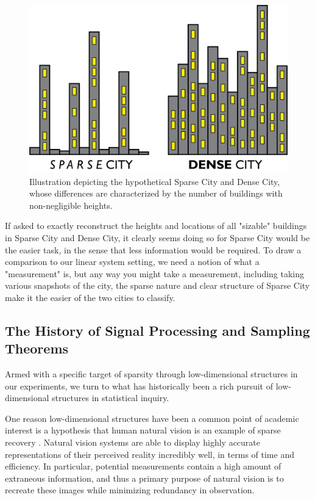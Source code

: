 \documentclass[12pt,a4paper]{amsart}
\numberwithin{equation}{section}
\theoremstyle{plain}
\theoremstyle{definition}
\begin{document}
\begin{figure}
\includegraphics[scale = 0.7]{sparse_dense_city_final.png}
\caption{Illustration depicting the hypothetical Sparse City and Dense City, whose differences are characterized by the number of buildings with non-negligible heights.}
\label{ill}
\end{figure}

If asked to exactly reconstruct the heights and locations of all "sizable" buildings in Sparse City and Dense City, it clearly seems doing so for Sparse City would be the easier task, in the sense that less information would be required. To draw a comparison to our linear system setting, we need a notion of what a "measurement" is, but any way you might take a measurement, including taking various snapshots of the city, the sparse nature and clear structure of Sparse City make it the easier of the two cities to classify.


\subsection*{The History of Signal Processing and Sampling Theorems}

Armed with a specific target of sparsity through low-dimensional structures in our experiments, we turn to what has historically been a rich pursuit of low-dimensional structures in statistical inquiry.

One reason low-dimensional structures have been a common point of academic interest is a hypothesis that human natural vision is an example of sparse recovery \cite{wm}. Natural vision systems are able to display highly accurate representations of their perceived reality incredibly well, in terms of time and efficiency. In particular, potential measurements contain a high amount of extraneous information, and thus a primary purpose of natural vision is to recreate these images while minimizing redundancy in observation. 
\end{document}
